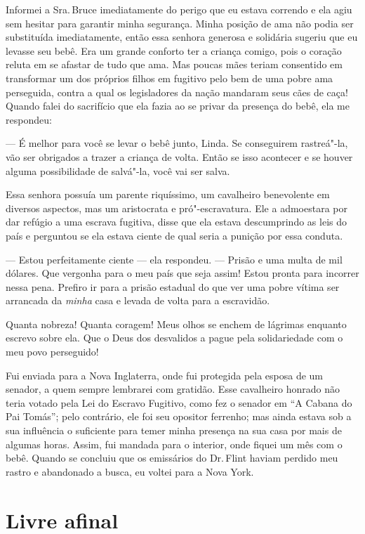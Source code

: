 Informei a Sra.\,Bruce imediatamente do
perigo que eu estava correndo e ela agiu sem hesitar para garantir minha
segurança. Minha posição de ama não podia ser substituída imediatamente,
então essa senhora generosa e solidária sugeriu que eu levasse seu bebê.
Era um grande conforto ter a criança comigo, pois o coração reluta em se
afastar de tudo que ama. Mas poucas mães teriam consentido em
transformar um dos próprios filhos em fugitivo pelo bem de uma pobre ama
perseguida, contra a qual os legisladores da nação mandaram seus cães de
caça! Quando falei do sacrifício que ela fazia ao se privar da presença
do bebê, ela me respondeu:

--- É melhor para você se levar o bebê junto, Linda. Se conseguirem
rastreá"-la, vão ser obrigados a trazer a criança de volta. Então se isso
acontecer e se houver alguma possibilidade de salvá"-la, você vai ser
salva.

Essa senhora possuía um parente
riquíssimo, um cavalheiro benevolente em diversos aspectos, mas um
aristocrata e pró"-escravatura. Ele a admoestara por dar refúgio a uma
escrava fugitiva, disse que ela estava descumprindo as leis do país e
perguntou se ela estava ciente de qual seria a punição por essa conduta.

--- Estou perfeitamente ciente --- ela respondeu. --- Prisão e uma multa
de mil dólares. Que vergonha para o meu país que seja assim! Estou
pronta para incorrer nessa pena. Prefiro ir para a prisão estadual do
que ver uma pobre vítima ser arrancada da \emph{minha} casa e levada de
volta para a escravidão.

Quanta nobreza! Quanta coragem! Meus
olhos se enchem de lágrimas enquanto escrevo sobre ela. Que o Deus dos
desvalidos a pague pela solidariedade com o meu povo perseguido!

Fui enviada para a Nova Inglaterra,
onde fui protegida pela esposa de um senador, a quem sempre lembrarei
com gratidão. Esse cavalheiro honrado não teria votado pela Lei do
Escravo Fugitivo, como fez o senador em ``A Cabana do Pai Tomás''; pelo
contrário, ele foi seu opositor ferrenho; mas ainda estava sob a sua
influência o suficiente para temer minha presença na sua casa por mais
de algumas horas. Assim, fui mandada para o interior, onde fiquei um mês
com o bebê. Quando se concluiu que os emissários do Dr.\,Flint haviam
perdido meu rastro e abandonado a busca, eu voltei para a Nova York.

\chapter*{Livre afinal}

